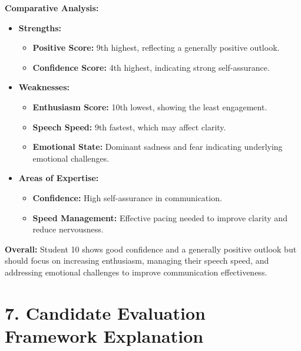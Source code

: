\documentclass{article}
\begin{document}
\textbf{Comparative Analysis:}
\begin{itemize}
    \item \textbf{Strengths:}
    \begin{itemize}
        \item \textbf{Positive Score:} 9th highest, reflecting a generally positive outlook.
        \item \textbf{Confidence Score:} 4th highest, indicating strong self-assurance.
    \end{itemize}
    \item \textbf{Weaknesses:}
    \begin{itemize}
        \item \textbf{Enthusiasm Score:} 10th lowest, showing the least engagement.
        \item \textbf{Speech Speed:} 9th fastest, which may affect clarity.
        \item \textbf{Emotional State:} Dominant sadness and fear indicating underlying emotional challenges.
    \end{itemize}
    \item \textbf{Areas of Expertise:}
    \begin{itemize}
        \item \textbf{Confidence:} High self-assurance in communication.
        \item \textbf{Speed Management:} Effective pacing needed to improve clarity and reduce nervousness.
    \end{itemize}
\end{itemize}

\textbf{Overall:} Student 10 shows good confidence and a generally positive outlook but should focus on increasing enthusiasm, managing their speech speed, and addressing emotional challenges to improve communication effectiveness.






\section{7. Candidate Evaluation Framework Explanation}
\end{document}
